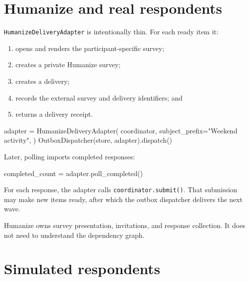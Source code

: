 \documentclass[
  10pt,
]{report}
\newenvironment{Shaded}{}{}
\newcommand{\NormalTok}[1]{#1}
\newcommand{\OperatorTok}[1]{\textcolor[rgb]{0.40,0.40,0.40}{#1}}
\newcommand{\StringTok}[1]{\textcolor[rgb]{0.25,0.44,0.63}{#1}}
\providecommand{\tightlist}{%
  \setlength{\itemsep}{0pt}\setlength{\parskip}{0pt}}
\begin{document}
\chapter{Humanize and real
respondents}\label{humanize-and-real-respondents}

\texttt{HumanizeDeliveryAdapter} is intentionally thin. For each ready
item it:

\begin{enumerate}
\def\labelenumi{\arabic{enumi}.}
\tightlist
\item
  opens and renders the participant-specific survey;
\item
  creates a private Humanize survey;
\item
  creates a delivery;
\item
  records the external survey and delivery identifiers; and
\item
  returns a delivery receipt.
\end{enumerate}

\begin{Shaded}
\begin{Highlighting}[]
\NormalTok{adapter }\OperatorTok{=}\NormalTok{ HumanizeDeliveryAdapter(}
\NormalTok{    coordinator,}
\NormalTok{    subject\_prefix}\OperatorTok{=}\StringTok{"Weekend activity"}\NormalTok{,}
\NormalTok{)}
\NormalTok{OutboxDispatcher(store, adapter).dispatch()}
\end{Highlighting}
\end{Shaded}

Later, polling imports completed responses:

\begin{Shaded}
\begin{Highlighting}[]
\NormalTok{completed\_count }\OperatorTok{=}\NormalTok{ adapter.poll\_completed()}
\end{Highlighting}
\end{Shaded}

For each response, the adapter calls \texttt{coordinator.submit()}. That
submission may make new items ready, after which the outbox dispatcher
delivers the next wave.

Humanize owns survey presentation, invitations, and response collection.
It does not need to understand the dependency graph.

\chapter{Simulated respondents}\label{simulated-respondents}
\end{document}
